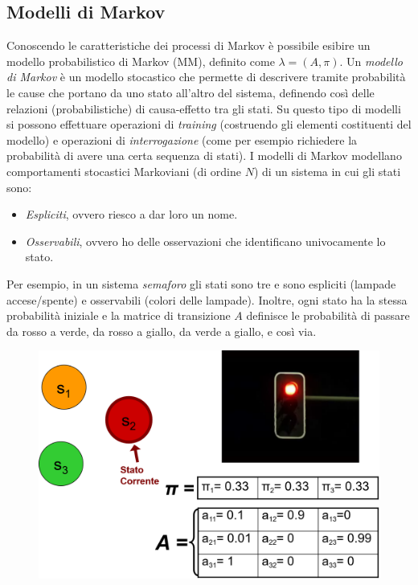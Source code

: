 \documentclass[a4paper,oneside,titlepage]{book}
\begin{document}
\subsection{Modelli di Markov}
Conoscendo le caratteristiche dei processi di Markov è possibile esibire un modello probabilistico di Markov (MM), definito come $\lambda = (A, \pi)$. Un \textit{modello di Markov} è un modello stocastico che permette di descrivere tramite probabilità le cause che portano da uno stato all'altro del sistema, definendo così delle relazioni (probabilistiche) di causa-effetto tra gli stati. Su questo tipo di modelli si possono effettuare operazioni di \textit{training} (costruendo gli elementi costituenti del modello) e operazioni di \textit{interrogazione} (come per esempio richiedere la probabilità di avere una certa sequenza di stati).
\newpage
I modelli di Markov modellano comportamenti stocastici Markoviani (di ordine $N$) di un sistema in cui gli stati sono:
\begin{itemize}
    \item \textit{Espliciti}, ovvero riesco a dar loro un nome.
    \item \textit{Osservabili}, ovvero ho delle osservazioni che identificano univocamente lo stato.
\end{itemize}
Per esempio, in un sistema \textit{semaforo} gli stati sono tre e sono espliciti (lampade accese/spente) e osservabili (colori delle lampade). Inoltre, ogni stato ha la stessa probabilità iniziale e la matrice di transizione $A$ definisce le probabilità di passare da rosso a verde, da rosso a giallo, da verde a giallo, e così via.
\begin{figure}[htp]
	\centering
	\includegraphics[width=\textwidth, height=\textheight, keepaspectratio]{semaforo.png}
\end{figure}
\end{document}
